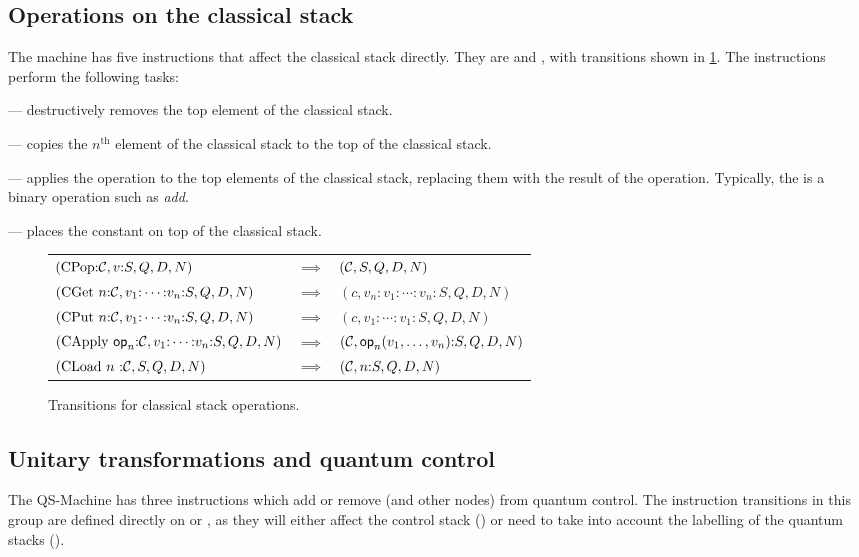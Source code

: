 \subsection{Operations on the classical stack}\label{subsec:operationsonclassicalstack}
The machine has five instructions that affect the classical stack directly.
They are  and , with 
transitions shown in \ref{fig:trans:classicalops}. The instructions perform
the following tasks:
\begin{description}
\item{} --- destructively removes the top element of the
classical stack.
\item{} --- copies the $n^{\text{th}}$ element of the 
classical stack to the top of the classical stack.
\item{} --- applies the operation  to 
the top elements of the classical stack, replacing them with the result of 
the operation. Typically, the 
 is  a binary operation such as 
\emph{add}.
\item{} --- places the constant   on
 top  of the classical stack.
\end{description}

\begin{figure}[htbp]
\begin{tabular}{lll}
$(\mathrm{CPop} {:}\mathcal{C},v{:}S,Q,D,N) $ &$\implies  $ &$(\mathcal{C},S,Q,D,N)$ \\[12pt]
$(\mathrm{CGet}\ n {:}\cd,v_1{:}\cdots{:}v_n{:}S,Q,D,N)  $ &$\implies $ &$ (c,v_n{:}v_1{:}\cdots{:}v_n{:}S,Q,D,N)$ \\[12pt]
$(\mathrm{CPut}\ n {:}\cd,v_1{:}\cdots{:}v_n{:}S,Q,D,N)  $ &$\implies  $ &$(c,v_1{:}\cdots{:}v_1{:}S,Q,D,N)$ \\[12pt]
$(\mathrm{CApply}\ \mathrm{\textsf{op}}_n{:}\cd,v_1{:}\cdots{:}v_n{:}S,Q,D,N)  $ &$\implies  $ &$(\mathcal{C},\mathrm{\textsf{op}}_n(v_1,\ldots,v_n){:}S,Q,D,N)$ \\[12pt]
$(\mathrm{CLoad}\ n\ {:}\mathcal{C},S,Q,D,N) $ &$ \implies $ &$ (\mathcal{C},n{:}S,Q,D,N)$
\end{tabular}
\caption{Transitions for classical stack operations.}\label{fig:trans:classicalops}
\end{figure}

\subsection{Unitary transformations and quantum control}\label{subsec:trans:unitarytransformations}
The QS-Machine has three instructions which add or remove \qubits{} (and other nodes)
from quantum control. The instruction transitions in this group
are defined directly on \cms{} or \lbms,  
as they will either affect the control
stack () or need to take into account
 the labelling of the quantum stacks (). 

